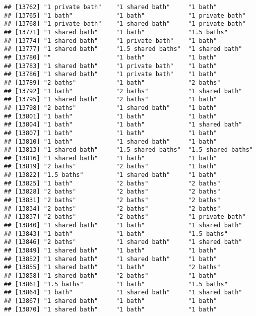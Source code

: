 \documentclass[
]{article}
\begin{document}
\begin{verbatim}
## [13762] "1 private bath"    "1 shared bath"     "1 bath"           
## [13765] "1 bath"            "1 bath"            "1 private bath"   
## [13768] "1 private bath"    "1 shared bath"     "1 private bath"   
## [13771] "1 shared bath"     "1 bath"            "1.5 baths"        
## [13774] "1 shared bath"     "1 private bath"    "1 bath"           
## [13777] "1 shared bath"     "1.5 shared baths"  "1 shared bath"    
## [13780] ""                  "1 bath"            "1 bath"           
## [13783] "1 shared bath"     "1 private bath"    "1 bath"           
## [13786] "1 shared bath"     "1 private bath"    "1 bath"           
## [13789] "2 baths"           "1 bath"            "2 baths"          
## [13792] "1 bath"            "2 baths"           "1 shared bath"    
## [13795] "1 shared bath"     "2 baths"           "1 bath"           
## [13798] "2 baths"           "1 shared bath"     "1 bath"           
## [13801] "1 bath"            "1 bath"            "1 bath"           
## [13804] "1 bath"            "1 bath"            "1 shared bath"    
## [13807] "1 bath"            "1 bath"            "1 bath"           
## [13810] "1 bath"            "1 shared bath"     "1 bath"           
## [13813] "1 shared bath"     "1.5 shared baths"  "1.5 shared baths" 
## [13816] "1 shared bath"     "1 bath"            "1 bath"           
## [13819] "2 baths"           "2 baths"           "1 bath"           
## [13822] "1.5 baths"         "1 shared bath"     "1 bath"           
## [13825] "1 bath"            "2 baths"           "2 baths"          
## [13828] "2 baths"           "2 baths"           "2 baths"          
## [13831] "2 baths"           "2 baths"           "2 baths"          
## [13834] "2 baths"           "2 baths"           "2 baths"          
## [13837] "2 baths"           "2 baths"           "1 private bath"   
## [13840] "1 shared bath"     "1 bath"            "1 shared bath"    
## [13843] "1 bath"            "1 bath"            "1.5 baths"        
## [13846] "2 baths"           "1 shared bath"     "1 shared bath"    
## [13849] "1 shared bath"     "1 bath"            "1 bath"           
## [13852] "1 shared bath"     "1 shared bath"     "1 bath"           
## [13855] "1 shared bath"     "1 bath"            "2 baths"          
## [13858] "1 shared bath"     "2 baths"           "1 bath"           
## [13861] "1.5 baths"         "1 bath"            "1.5 baths"        
## [13864] "1 bath"            "1 shared bath"     "1 shared bath"    
## [13867] "1 shared bath"     "1 bath"            "1 bath"           
## [13870] "1 shared bath"     "1 bath"            "1 bath"           

\end{verbatim}
\end{document}
